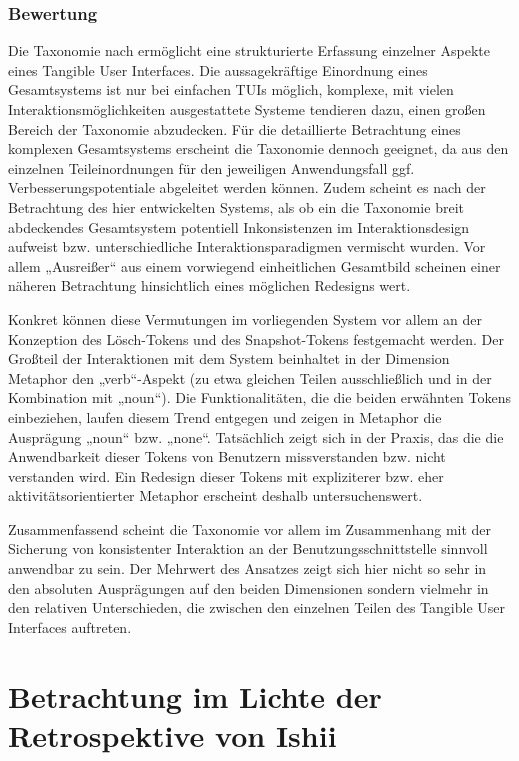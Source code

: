 \subsubsection{Bewertung}

Die Taxonomie nach \citeauthor{Fishkin04} ermöglicht eine strukturierte Erfassung einzelner Aspekte eines Tangible User Interfaces. Die aussagekräftige Einordnung eines Gesamtsystems  ist nur bei einfachen \glspl{TUI} möglich, komplexe, mit vielen Interaktionsmöglichkeiten ausgestattete Systeme tendieren dazu, einen großen Bereich der Taxonomie abzudecken. Für die detaillierte Betrachtung eines komplexen Gesamtsystems erscheint die Taxonomie dennoch geeignet, da aus den einzelnen Teileinordnungen für den jeweiligen Anwendungsfall ggf. Verbesserungspotentiale abgeleitet werden können. Zudem scheint es nach der Betrachtung des hier entwickelten Systems, als ob ein die Taxonomie breit abdeckendes Gesamtsystem potentiell Inkonsistenzen im Interaktionsdesign aufweist bzw. unterschiedliche Interaktionsparadigmen vermischt wurden. Vor allem „Ausreißer“ aus einem vorwiegend einheitlichen Gesamtbild scheinen einer näheren Betrachtung hinsichtlich eines möglichen Redesigns wert.

Konkret können diese Vermutungen im vorliegenden System vor allem an der Konzeption des Lösch-Tokens und des Snapshot-Tokens festgemacht werden. Der Großteil der Interaktionen mit dem System beinhaltet in der Dimension Metaphor den „verb“-Aspekt (zu etwa gleichen Teilen ausschließlich und in der Kombination mit „noun“). Die Funktionalitäten, die die beiden erwähnten Tokens einbeziehen, laufen diesem Trend entgegen und zeigen in Metaphor die Ausprägung „noun“ bzw. „none“. Tatsächlich zeigt sich in der Praxis, das die die Anwendbarkeit dieser Tokens von Benutzern missverstanden bzw. nicht verstanden wird. Ein Redesign dieser Tokens mit expliziterer bzw. eher aktivitätsorientierter Metaphor erscheint deshalb untersuchenswert.

Zusammenfassend scheint die Taxonomie vor allem im Zusammenhang mit der Sicherung von konsistenter Interaktion an der Benutzungsschnittstelle sinnvoll anwendbar zu sein. Der Mehrwert des Ansatzes zeigt sich hier nicht so sehr in den absoluten Ausprägungen auf den beiden Dimensionen sondern vielmehr in den relativen Unterschieden, die zwischen den einzelnen Teilen des Tangible User Interfaces auftreten.


\section{Betrachtung im Lichte der Retrospektive von Ishii} %
\label{sec:betrachtung_im_lichte_der_retrospektive_von_ishii}

